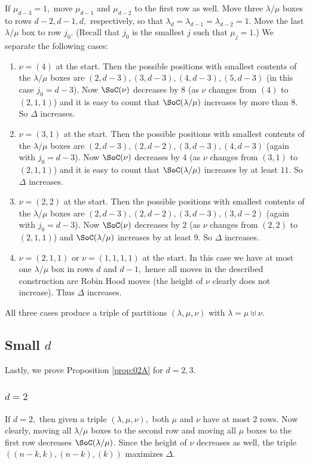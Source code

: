 \documentclass[12pt,dvipsnames,accepted=2016-08-18,a4paper,onecolumn]{quantumarticle}
\def\la{\lambda}
\def\la{\lambda}
\numberwithin{equation}{section}
\theoremstyle{definition}
\begin{document}
If $\mu_{d-3} = 1,$ move $\mu_{d-1}$ and $\mu_{d-2}$ to the first row as well. Move three $\la/\mu$ boxes to rows $d-2,d-1,d,$ respectively, so that $\la_d=\la_{d-1}=\la_{d-2}=1.$ Move the last $\la/\mu$ box to row $j_0.$ (Recall that $j_0$ is the smallest $j$ such that $\mu_j=1.$) We separate the following cases:
\begin{enumerate}
    \item $\nu=(4)$ at the start. Then the possible positions with smallest contents of the  $\la/\mu$ boxes are $(2,d-3),(3,d-3),(4,d-3),(5,d-3)$ (in this case $j_0=d-3$). Now $\SoC(\nu)$ decreases by $8$ (as $\nu$ changes from $(4)$ to $(2,1,1)$) and it is easy to count that $\SoC(\la/\mu)$ increases by more than $8.$ So $\Delta$ increases.
    \item $\nu=(3,1)$ at the start. Then the possible positions with smallest contents of the  $\la/\mu$ boxes are $(2,d-3),(2,d-2),(3,d-3),(4,d-3)$ (again with $j_0=d-3$). Now $\SoC(\nu)$ decreases by $4$ (as $\nu$ changes from $(3,1)$ to $(2,1,1)$) and it is easy to count that $\SoC(\la/\mu)$ increases by at least $11.$ So $\Delta$ increases.
    \item $\nu=(2,2)$ at the start. Then the possible positions with smallest contents of the  $\la/\mu$ boxes are $(2,d-3),(2,d-2),(3,d-3),(3,d-2)$ (again with $j_0=d-3$). Now $\SoC(\nu)$ decreases by $2$ (as $\nu$ changes from $(2,2)$ to $(2,1,1)$) and $\SoC(\la/\mu)$ increases by at least $9.$ So $\Delta$ increases.
    \item $\nu=(2,1,1)$ or $\nu=(1,1,1,1)$ at the start. In this case we have at most one $\la/\mu$ box in rows $d$ and $d-1,$ hence all moves in the described construction are Robin Hood moves (the height of $\nu$ clearly does not increase). Thus $\Delta$ increases.
\end{enumerate}
All three cases produce a triple of partitions $(\la,\mu,\nu)$ with $\la = \mu \uplus \nu.$

\subsection{Small $d$}

Lastly, we prove Proposition \ref{prop:02A} for $d=2,3$. 

\subsubsection{$d=2$}
If $d=2,$ then given a triple $(\la,\mu,\nu),$ both $\mu$ and $\nu$ have at most $2$ rows. Now clearly, moving all $\la/\mu$ boxes to the second row and moving all $\mu$ boxes to the first row decreases $\SoC(\la/\mu)$. Since the height of $\nu$ decreases as well, the triple $((n-k,k),(n-k),(k))$ maximizes $\Delta.$
\end{document}
